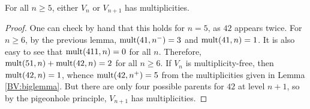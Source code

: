 \begin{theorem}
For all $n \ge 5$, either $V_n$ or $V_{n+1}$ has multiplicities.
\end{theorem}
\begin{proof}
One can check by hand that this holds for $n=5$, as $42$ appears twice.
For $n \ge 6$, by the previous lemma, $\textup{mult}(41,n^-) = 3$ and $\textup{mult}(41,n)=1$. It is also easy to see that $\textup{mult}(411,n)=0$ for all $n$. Therefore, $\textup{mult}(51,n) + \textup{mult}(42,n) = 2$ for all $n \ge 6$. If $V_n$ is multiplicity-free, then $\textup{mult}(42,n)=1$, whence $\textup{mult}(42,n^+)=5$ from the multiplicities given in Lemma \ref{BV:biglemma}. But there are only four possible parents for $42$ at level $n+1$, so by the pigeonhole principle, $V_{n+1}$ has multiplicities.
\end{proof}